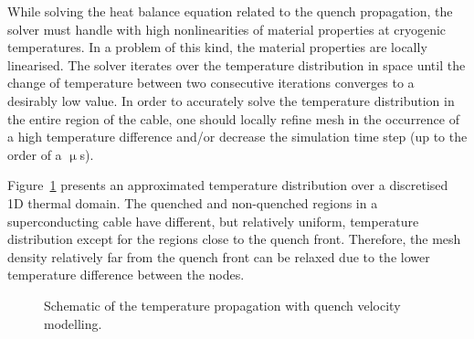 
While solving the heat balance equation related to the quench propagation, the solver must handle with high nonlinearities of material properties at cryogenic temperatures. In a problem of this kind, the material properties are locally linearised. The solver iterates over the temperature distribution in space until the change of temperature between two consecutive iterations converges to a desirably low value. In order to accurately solve the temperature distribution in the entire region of the cable, one should locally refine mesh in the occurrence of a high temperature difference and/or decrease the simulation time step (up to the order of a $\upmu$s).

Figure~\ref{fig:modelling_approach} presents an approximated temperature distribution over a discretised 1D thermal domain. The quenched and non-quenched regions in a superconducting cable have different, but relatively uniform, temperature distribution except for the regions close to the quench front. Therefore, the mesh density relatively far from the quench front can be relaxed due to the lower temperature difference between the nodes. 

\begin{figure}[H]
\centering
{}
\caption{Schematic of the temperature propagation with quench velocity modelling.}
\label{fig:modelling_approach}
\end{figure}

